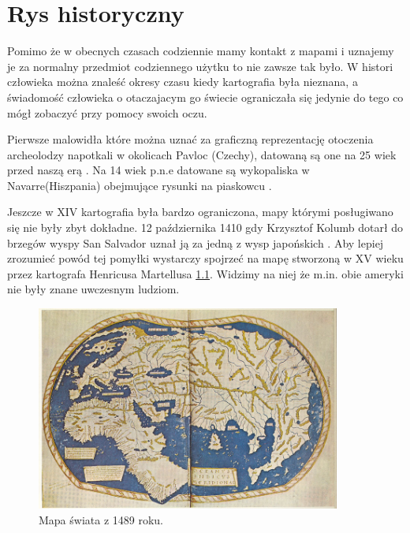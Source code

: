 
\chapter{Rys historyczny}
\label{sec:hisotryMap}

Pomimo że w obecnych czasach codziennie mamy kontakt z mapami i uznajemy je za normalny przedmiot codziennego użytku to nie zawsze tak było. W histori człowieka można znaleść okresy czasu kiedy kartografia była nieznana, a świadomość człowieka o otaczajacym go świecie ograniczała się jedynie do tego co mógł zobaczyć przy pomocy swoich oczu.

Pierwsze malowidła które można uznać za graficzną reprezentację otoczenia archeolodzy napotkali w okolicach Pavloc (Czechy), datowaną są one na 25 wiek przed naszą erą \cite{pre2} . Na 14 wiek p.n.e datowane są wykopaliska w Navarre(Hiszpania) obejmujące rysunki na piaskowcu \cite{pre1}.

Jeszcze w XIV kartografia była bardzo ograniczona, mapy którymi posługiwano się nie były zbyt dokładne. 12 października 1410 gdy Krzysztof Kolumb dotarł do brzegów wyspy San Salvador uznał ją za jedną z wysp japońskich \cite{columb}. Aby lepiej zrozumieć powód tej pomyłki wystarczy spojrzeć na mapę stworzoną w XV wieku przez kartografa Henricusa Martellusa \ref{fig:worldMap1}. Widzimy na niej że m.in. obie ameryki nie były znane uwczesnym ludziom.

\begin{figure}[H]
  \centering
    \includegraphics[width=100mm]{ge/worldMap1.jpg}
  \caption{Mapa świata z 1489 roku.}
  \label{fig:worldMap1}
\end{figure}
